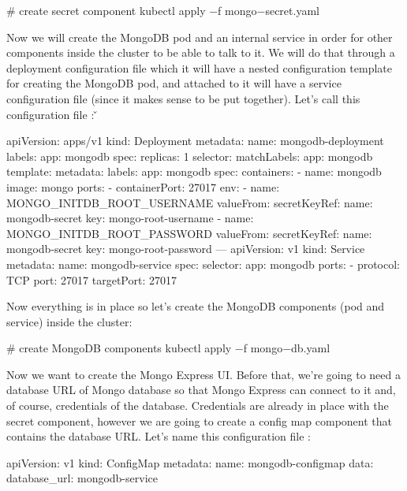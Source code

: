 \begin{bash}
# create secret component
kubectl apply $-$f mongo$-$secret.yaml
\end{bash}

Now we will create the MongoDB pod and an internal service in order for other components inside the cluster to be
able to talk to it. We will do that through a deployment configuration file which it will have a nested configuration
template for creating the MongoDB pod, and attached to it will have a service configuration file (since it makes
sense to be put together). Let's call this configuration file : \v

\begin{block}
apiVersion: apps/v1
kind: Deployment
metadata:
  name: mongodb-deployment
  labels:
    app: mongodb
spec:
  replicas: 1
  selector:
    matchLabels:
      app: mongodb
  template:
    metadata:
      labels:
        app: mongodb
    spec:
      containers:
      - name: mongodb
        image: mongo
        ports:
        - containerPort: 27017
        env:
        - name: MONGO_INITDB_ROOT_USERNAME
          valueFrom:
            secretKeyRef:
              name: mongodb-secret
              key: mongo-root-username
        - name: MONGO_INITDB_ROOT_PASSWORD
          valueFrom:
            secretKeyRef:
              name: mongodb-secret
              key: mongo-root-password
---
apiVersion: v1
kind: Service
metadata:
  name: mongodb-service
spec:
  selector:
    app: mongodb
  ports:
    - protocol: TCP
      port: 27017
      targetPort: 27017
\end{block}

Now everything is in place so let's create the MongoDB components (pod and service) inside the cluster:

\begin{bash}
# create MongoDB components
kubectl apply $-$f mongo$-$db.yaml
\end{bash}

Now we want to create the Mongo Express UI. Before that, we're going to need a database URL of Mongo database so that
Mongo Express can connect to it and, of course, credentials of the database. Credentials are already in place with
the secret component, however we are going to create a config map component that contains the database URL. Let's
name this configuration file :

\begin{block}
apiVersion: v1
kind: ConfigMap
metadata:
  name: mongodb-configmap
data:
  database_url: mongodb-service
\end{block}

